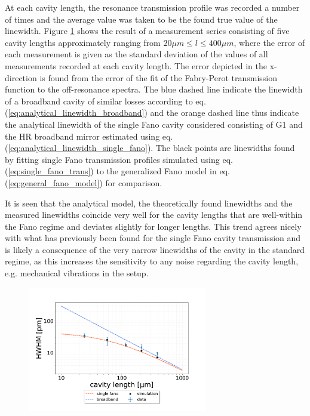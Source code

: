 At each cavity length, the resonance transmission profile was recorded a number of times and the average value was taken to be the found true value of the linewidth. Figure \ref{fig:HWHM_vs_time_single_fano_data} shows the result of a measurement series consisting of five cavity lengths approximately ranging from $20\mu m \leq l \leq 400 \mu m$, where the error of each measurement is given as the standard deviation of the values of all measurements recorded at each cavity length\cite{Hughes}. The error depicted in the x-direction is found from the error of the fit of the Fabry-Perot transmission function to the off-resonance spectra. The blue dashed line indicate the linewidth of a broadband cavity of similar losses according to eq. (\ref{eq:analytical_linewidth_broadband}) and the orange dashed line thus indicate the analytical linewidth of the single Fano cavity considered consisting of G1 and the HR broadband mirror estimated using eq. (\ref{eq:analytical_linewidth_single_fano}). The black points are linewidths found by fitting single Fano transmission profiles simulated using eq. (\ref{eq:single_fano_trans}) to the generalized Fano model in eq. (\ref{eq:general_fano_model}) for comparison. 

It is seen that the analytical model, the theoretically found linewidths and the measured linewidths coincide very well for the cavity lengths that are well-within the Fano regime and deviates slightly for longer lengths. This trend agrees nicely with what has previously been found for the single Fano cavity transmission\cite{Mitra} and is likely a consequence of the very narrow linewidths of the cavity in the standard regime, as this increases the sensitivity to any noise regarding the cavity length, e.g. mechanical vibrations in the setup.

\begin{figure}[h!]
    \centering
    \includegraphics[width=0.7\textwidth]{figures/results/HWHM_vs_cavity_length_single_fano.pdf}
    \caption{}
    \label{fig:HWHM_vs_time_single_fano_data}
\end{figure}

